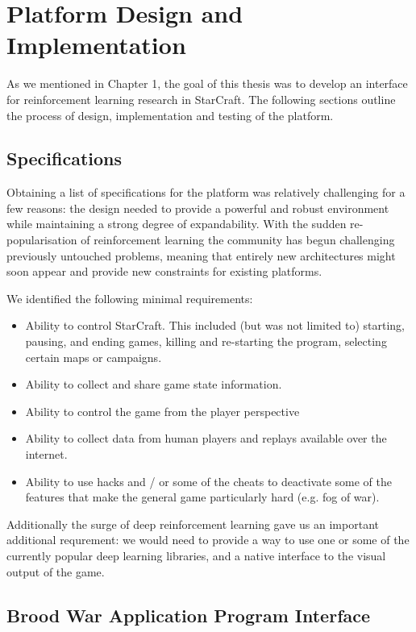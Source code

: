 \chapter{Platform Design and Implementation}

As we mentioned in Chapter 1, the goal of this thesis was to develop an
interface for reinforcement learning research in StarCraft. The following
sections outline the process of design, implementation and testing of the
platform.

\section{Specifications}

Obtaining a list of specifications for the platform was relatively challenging
for a few reasons: the design needed to provide a powerful and robust
environment while maintaining a strong degree of expandability. With the sudden
re-popularisation of reinforcement learning the community has begun challenging
previously untouched problems, meaning that entirely new architectures might
soon appear and provide new constraints for existing platforms.

We identified the following minimal requirements:

\begin{itemize}
\item Ability to control StarCraft. This included (but was not limited to)
  starting, pausing, and ending games, killing and re-starting the program,
  selecting certain maps or campaigns.
\item Ability to collect and share game state information.
\item Ability to control the game from the player perspective
\item Ability to collect data from human players and replays available over the
  internet.
\item Ability to use hacks and / or some of the cheats to deactivate some of the
  features that make the general game particularly hard (e.g. fog of war).
\end{itemize}

Additionally the surge of deep reinforcement learning gave us an important
additional requrement: we would need to provide a way to use one or some of the
currently popular deep learning libraries, and a native interface to the visual
output of the game.

\section{Brood War Application Program Interface}

